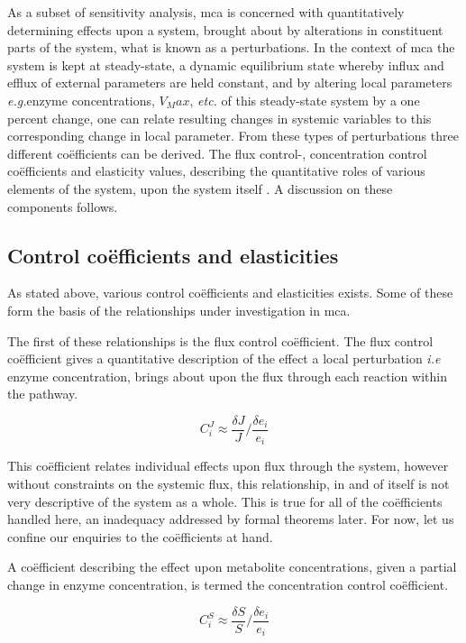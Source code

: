 As a subset of sensitivity analysis, \gls{mca} is concerned with quantitatively determining effects upon a system, brought about by alterations in constituent parts of the system, what is known as a perturbations. In the context of \gls{mca} the system is kept at \gls{steady-state}, a dynamic equilibrium state whereby influx and efflux of external parameters are held constant, and by altering local parameters \textit{e.g.}enzyme concentrations, $V_Max$, \textit{etc.} of this \gls{steady-state} system by a one percent change, one can relate resulting changes in systemic variables to this corresponding change in local parameter. From these types of perturbations three different co\"efficients can be derived. The flux control-, concentration control co\"efficients and elasticity values, describing the quantitative roles of various elements of the system, upon the system itself \citep{Kacser1979}. A discussion on these components follows.

\subsection{Control co\"efficients and elasticities} 
As stated above, various control co\"efficients and elasticities exists. Some of these form the basis of the relationships under investigation in \gls{mca}.

The first of these relationships is the flux control co\"efficient. The flux control co\"efficient gives a quantitative description of the effect a local perturbation \textit{i.e} enzyme concentration, brings about upon the flux through each reaction within the pathway.

\begin{equation}
C^{J}_{i}\approx\dfrac {\delta J}{J}/\dfrac {\delta e_{i}}{e_{i}}
\end{equation}

This co\"efficient relates individual effects upon flux through the system, however without constraints on the systemic flux, this relationship, in and of itself is not very descriptive of the system as a whole. This is true for all of the co\"efficients handled here, an inadequacy addressed by formal theorems later. For now, let us confine our enquiries to the co\"efficients at hand.

A co\"efficient describing the effect upon metabolite concentrations, given a partial change in enzyme concentration, is termed the concentration control co\"efficient.

\begin{equation}
C^{S}_{i}\approx\dfrac{\delta S}{S}/\dfrac{\delta e_{i}}{e_{i}}
\end{equation}

